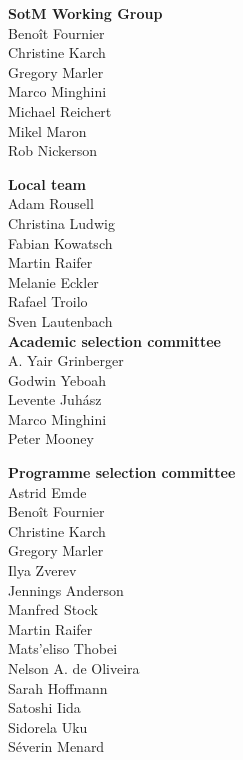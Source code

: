 \newlength{\volunteerSpace}
\setlength{}
\RaggedRight
\begin{multicols}{2}
  \begin{small}
    \textbf{SotM Working Group}\\
    Benoît Fournier\\
    Christine Karch\\
    Gregory Marler\\
    Marco Minghini\\
    Michael Reichert\\
    Mikel Maron\\
    Rob Nickerson

    \vspace{\volunteerSpace}
    \textbf{Local team}\\
    Adam Rousell\\
    Christina Ludwig\\
    Fabian Kowatsch\\
    Martin Raifer\\
    Melanie Eckler\\
    Rafael Troilo\\
    Sven Lautenbach\\

    \vspace{\volunteerSpace}
    \textbf{Academic selection committee}\\
    A. Yair Grinberger\\
    Godwin Yeboah\\
    Levente Juhász\\
    Marco Minghini\\
    Peter Mooney

    \vspace{\volunteerSpace}
    \textbf{Programme selection \mbox{committee}}\\
    Astrid Emde\\
    Benoît Fournier\\
    Christine Karch\\
    Gregory Marler\\
    Ilya Zverev\\
    Jennings Anderson\\
    Manfred Stock\\
    Martin Raifer\\
    Mats'eliso Thobei\\
    Nelson A. de Oliveira\\
    Sarah Hoffmann\\
    Satoshi Iida\\
    Sidorela Uku\\
    Séverin Menard


\end{small}
\end{multicols}
